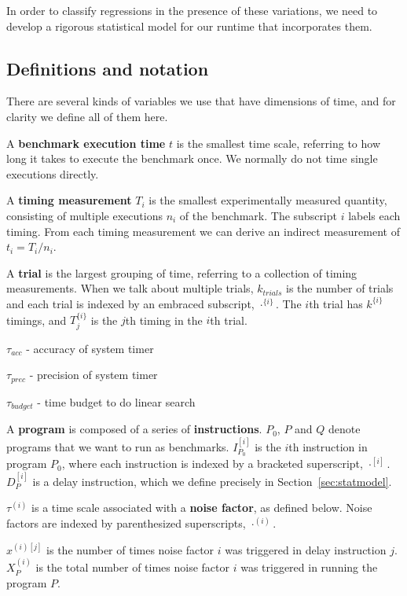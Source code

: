 \documentclass[conference]{IEEEtran}
\begin{document}
In order to classify regressions in the presence of these variations, we need to develop a rigorous statistical model for our runtime that incorporates them.

\subsection{Definitions and notation}

There are several kinds of variables we use that have dimensions of time, and for clarity we define all of them here.

A \textbf{benchmark execution time} $t$ is the smallest time scale, referring to how long it takes to execute the benchmark once. We normally do not time single executions directly.

A \textbf{timing measurement} $T_i$ is the smallest experimentally measured quantity, consisting of multiple executions $n_i$ of the benchmark. The subscript $i$ labels each timing. From each timing measurement we can derive an indirect measurement of $t_i = T_i/n_i$.

A \textbf{trial} is the largest grouping of time, referring to a collection of timing measurements. When we talk about multiple trials, $k_{trials}$ is the number of trials and each trial is indexed by an embraced subscript, $\cdot^{\{i\}}$. The $i$th trial has $k^{\{i\}}$ timings, and $T^{\{i\}}_j$ is the $j$th timing in the $i$th trial.

$\tau_{acc}$ - accuracy of system timer

$\tau_{prec}$ - precision of system timer

$\tau_{budget}$ - time budget to do linear search

A \textbf{program} is composed of a series of \textbf{instructions}. $P_0$, $P$ and $Q$ denote programs that we want to run as benchmarks. $I^{[i]}_{P_0}$ is the $i$th instruction in program $P_0$, where each instruction is indexed by a bracketed superscript, $\cdot^{[i]}$. $D^{[i]}_{P}$ is a delay instruction, which we define precisely in Section~\ref{sec:statmodel}.

$\tau^{(i)}$ is a time scale associated with a \textbf{noise factor}, as defined below. Noise factors are indexed by parenthesized superscripts, $\cdot^{(i)}$.

$x^{(i)[j]}$ is the number of times noise factor $i$ was triggered in delay instruction $j$. $X_P^{(i)}$ is the total number of times noise factor $i$ was triggered in running the program $P$.
\end{document}
